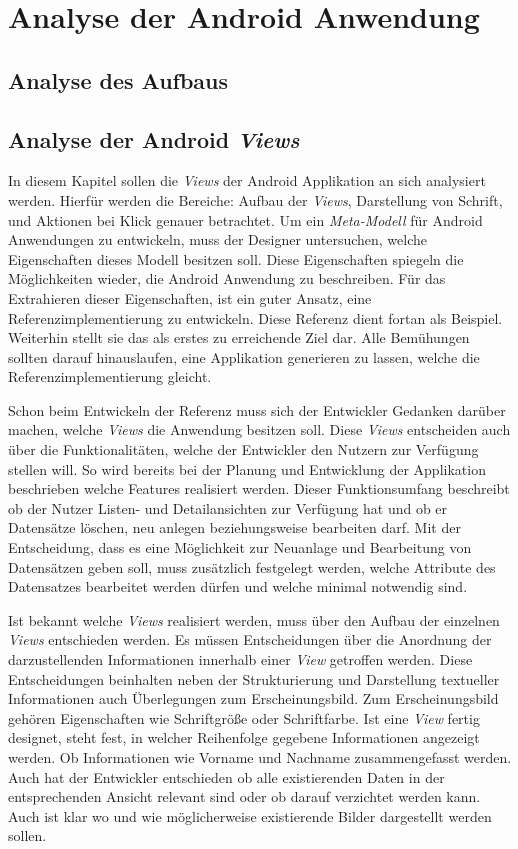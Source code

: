 
\section{Analyse der Android Anwendung}

\subsection{Analyse des Aufbaus}

\subsection{Analyse der Android \textit{Views}}
In diesem Kapitel sollen die \textit{Views} der Android Applikation an sich analysiert werden. Hierfür werden die Bereiche: Aufbau der \textit{Views}, Darstellung von Schrift, und Aktionen bei Klick genauer betrachtet. Um ein \textit{Meta-Modell} für Android Anwendungen zu entwickeln, muss der Designer untersuchen, welche Eigenschaften dieses Modell besitzen soll. Diese Eigenschaften spiegeln die Möglichkeiten wieder, die Android Anwendung zu beschreiben. Für das Extrahieren dieser Eigenschaften, ist ein guter Ansatz, eine Referenzimplementierung zu entwickeln. Diese Referenz dient fortan als Beispiel. Weiterhin stellt sie das als erstes zu erreichende Ziel dar. Alle Bemühungen sollten darauf hinauslaufen, eine Applikation generieren zu lassen, welche die Referenzimplementierung gleicht.

Schon beim Entwickeln der Referenz muss sich der Entwickler Gedanken darüber machen, welche \textit{Views} die Anwendung besitzen soll. Diese \textit{Views} entscheiden auch über die Funktionalitäten, welche der Entwickler den Nutzern zur Verfügung stellen will. So wird bereits bei der Planung und Entwicklung der Applikation beschrieben welche Features realisiert werden. Dieser Funktionsumfang beschreibt ob der Nutzer Listen- und Detailansichten zur Verfügung hat und ob er Datensätze löschen, neu anlegen beziehungsweise bearbeiten darf. Mit der Entscheidung, dass es eine Möglichkeit zur Neuanlage und Bearbeitung von Datensätzen geben soll, muss zusätzlich festgelegt werden, welche Attribute des Datensatzes bearbeitet werden dürfen und welche minimal notwendig sind.

Ist bekannt welche \textit{Views} realisiert werden, muss über den Aufbau der einzelnen \textit{Views} entschieden werden. Es müssen Entscheidungen über die Anordnung der darzustellenden Informationen innerhalb einer \textit{View} getroffen werden. Diese Entscheidungen beinhalten neben der Strukturierung und Darstellung textueller Informationen auch Überlegungen zum Erscheinungsbild. Zum Erscheinungsbild gehören Eigenschaften wie Schriftgröße oder Schriftfarbe. Ist eine \textit{View} fertig designet, steht fest, in welcher Reihenfolge gegebene Informationen angezeigt werden. Ob Informationen wie Vorname und Nachname zusammengefasst werden. Auch hat der Entwickler entschieden ob alle existierenden Daten in der entsprechenden Ansicht relevant sind oder ob darauf verzichtet werden kann.  Auch ist klar wo und wie möglicherweise existierende Bilder dargestellt werden sollen.

